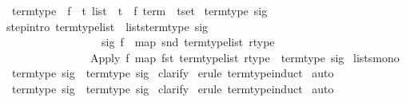 \begin{isabellebody}
\isanewline
{}\ term{\isacharunderscore}type{\isacharprime}\ {\isacharcolon}{\isacharcolon}\ {\isachardoublequote}{\isacharparenleft}{\isacharprime}f\ {\isasymRightarrow}\ {\isacharprime}t\ list\ {\isacharasterisk}\ {\isacharprime}t{\isacharparenright}\ {\isasymRightarrow}\ {\isacharparenleft}{\isacharprime}f\ term\ {\isacharasterisk}\ {\isacharprime}t{\isacharparenright}set{\isachardoublequote}\isanewline
{}\ {\isachardoublequote}term{\isacharunderscore}type{\isacharprime}\ sig{\isachardoublequote}\isanewline
{}\isanewline
step{\isacharbrackleft}intro{\isacharbrackright}{\isacharcolon}\ {\isachardoublequote}{\isasymlbrakk}term{\isacharunderscore}type{\isacharunderscore}list\ {\isasymin}\ lists{\isacharparenleft}term{\isacharunderscore}type{\isacharprime}\ sig{\isacharparenright}{\isacharsemicolon}\ \isanewline
\ \ \ \ \ \ \ \ \ \ \ \ \ \ \ \ \ sig\ f\ {\isacharequal}\ {\isacharparenleft}map\ snd\ term{\isacharunderscore}type{\isacharunderscore}list{\isacharcomma}\ rtype{\isacharparenright}{\isasymrbrakk}\isanewline
\ \ \ \ \ \ \ \ \ \ \ \ \ \ {\isasymLongrightarrow}\ {\isacharparenleft}Apply\ f\ {\isacharparenleft}map\ fst\ term{\isacharunderscore}type{\isacharunderscore}list{\isacharparenright}{\isacharcomma}\ rtype{\isacharparenright}\ {\isasymin}\ term{\isacharunderscore}type{\isacharprime}\ sig{\isachardoublequote}\isanewline
{}\ lists{\isacharunderscore}mono\isanewline
\isanewline
\isanewline
{}\ {\isachardoublequote}term{\isacharunderscore}type\ sig\ {\isasymsubseteq}\ term{\isacharunderscore}type{\isacharprime}\ sig{\isachardoublequote}\isanewline
{}\ clarify\isanewline
{}\ {\isacharparenleft}erule\ term{\isacharunderscore}type{\isachardot}induct{\isacharparenright}\isanewline
{}\ auto\isanewline
{}\isanewline
\isanewline
{}\ {\isachardoublequote}term{\isacharunderscore}type{\isacharprime}\ sig\ {\isasymsubseteq}\ term{\isacharunderscore}type\ sig{\isachardoublequote}\isanewline
{}\ clarify\isanewline
{}\ {\isacharparenleft}erule\ term{\isacharunderscore}type{\isacharprime}{\isachardot}induct{\isacharparenright}\isanewline
{}\ auto\isanewline
{}\isanewline
\isanewline
{}\isanewline
\isanewline
\end{isabellebody}%
